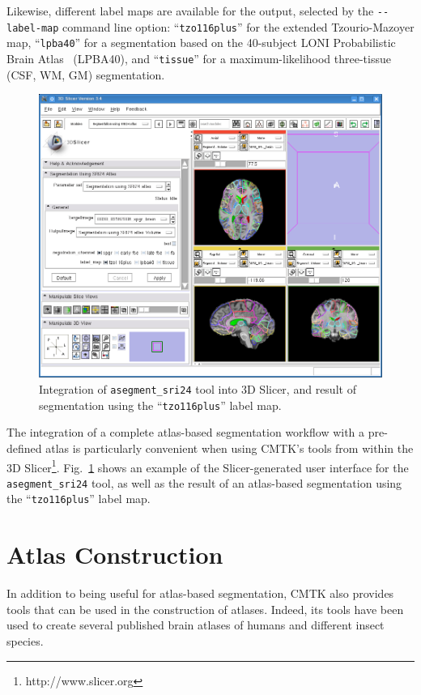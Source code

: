 \documentclass{InsightArticle}
\begin{document}
Likewise, different label maps are available for the output, selected by the
\verb|--label-map| command line option: ``\verb|tzo116plus|'' for the extended
Tzourio-Mazoyer map, ``\verb|lpba40|'' for a segmentation based on the
40-subject LONI Probabilistic Brain Atlas~\cite{ShatMirzAdis:2008} (LPBA40),
 and ``\verb|tissue|'' for a maximum-likelihood
three-tissue (CSF, WM, GM) segmentation.

\begin{figure}[tb]
\centerline{\includegraphics[width=\linewidth]{img/slicer-asegment_sri24}}
\caption{Integration of {\tt asegment\_sri24} tool into 3D Slicer, and result
  of segmentation using the ``{\tt tzo116plus}'' label map.}
\label{fig:SlicerSRI24}
\end{figure}

The integration of a complete atlas-based segmentation workflow with a
pre-defined atlas is particularly convenient when using CMTK's tools from
within the  3D
Slicer\footnote{http://www.slicer.org}. Fig.~\ref{fig:SlicerSRI24} shows an
example of the Slicer-generated user interface for the \verb|asegment_sri24|
tool, as well as the result of an atlas-based segmentation using the
``\verb|tzo116plus|'' label map.

\clearpage
\section{Atlas Construction}

In addition to being useful for atlas-based segmentation, CMTK also provides
tools that can be used in the construction of atlases. Indeed, its tools have
been used to create several published brain atlases of humans and different
insect species.
\end{document}
